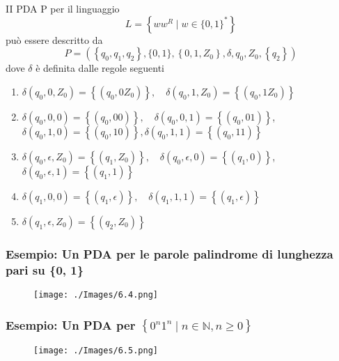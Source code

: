 II PDA P per il linguaggio
$$
L=\left\{w w^{R} \mid w \in\{0,1\}^{*}\right\}
$$
può essere descritto da
$$
P=\left(\left\{q_{0}, q_{1}, q_{2}\right\},\{0,1\},\left\{0,1, Z_{0}\right\}, \delta, q_{0}, Z_{0},\left\{q_{2}\right\}\right)
$$
dove $\delta$ è definita dalle regole seguenti
\begin{enumerate}
    \item $\delta\left(q_{0}, 0, Z_{0}\right)=\left\{\left(q_{0}, 0 Z_{0}\right)\right\}, \quad \delta\left(q_{0}, 1, Z_{0}\right)=\left\{\left(q_{0}, 1 Z_{0}\right)\right\}$
    \item $\delta\left(q_{0}, 0,0\right)=\left\{\left(q_{0}, 00\right)\right\}, \quad \delta\left(q_{0}, 0,1\right)=\left\{\left(q_{0}, 01\right)\right\}$,
$\delta\left(q_{0}, 1,0\right)=\left\{\left(q_{0}, 10\right)\right\}, \delta\left(q_{0}, 1,1\right)=\left\{\left(q_{0}, 11\right)\right\}$
    \item $\delta\left(q_{0}, \epsilon, Z_{0}\right)=\left\{\left(q_{1}, Z_{0}\right)\right\}, \quad \delta\left(q_{0}, \epsilon, 0\right)=\left\{\left(q_{1}, 0\right)\right\}$,
$\delta\left(q_{0}, \epsilon, 1\right)=\left\{\left(q_{1}, 1\right)\right\}$
    \item $\delta\left(q_{1}, 0,0\right)=\left\{\left(q_{1}, \epsilon\right)\right\}, \quad \delta\left(q_{1}, 1,1\right)=\left\{\left(q_{1}, \epsilon\right)\right\}$
    \item $\delta\left(q_{1}, \epsilon, Z_{0}\right)=\left\{\left(q_{2}, Z_{0}\right)\right\}$
\end{enumerate}

\subsubsection{Esempio: Un PDA per le parole palindrome di lunghezza
pari su \{0, 1\}}

\begin{figure}[hbpt!]
    \centering
    \texttt{[image: ./Images/6.4.png]}
\end{figure}
\FloatBarrier

\subsubsection{Esempio: Un PDA per $\left\{0^{n} 1^{n} \mid n \in \mathbb{N}, n \geq 0\right\}$}

\begin{figure}[hbpt!]
    \centering
    \texttt{[image: ./Images/6.5.png]}
\end{figure}
\FloatBarrier

